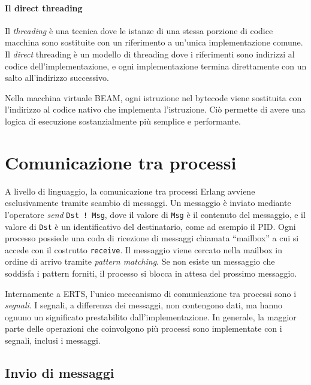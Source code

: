 \documentclass[target=bach,aauheader=,style=]{thud}
\newcommand{\eng}[1]{\foreignlanguage{english}{#1}}
\begin{document}
\paragraph{Il \eng{direct threading}}
Il \emph{\eng{threading}} è una tecnica dove le istanze di una stessa porzione di codice macchina sono sostituite con un riferimento a un'unica implementazione comune. Il \eng{\emph{direct} threading} è un modello di \eng{threading} dove i riferimenti sono indirizzi al codice dell'implementazione, e ogni implementazione termina direttamente con un salto all'indirizzo successivo.
\bigskip

Nella macchina virtuale BEAM, ogni istruzione nel \eng{bytecode} viene sostituita con l'indirizzo al codice nativo che implementa l'istruzione. Ciò permette di avere una logica di esecuzione sostanzialmente più semplice e performante.


\section{Comunicazione tra processi}

A livello di linguaggio, la comunicazione tra processi Erlang avviene esclusivamente tramite scambio di messaggi. Un messaggio è inviato mediante l'operatore \emph{\eng{send}} \lstinline{Dst ! Msg}, dove il valore di \lstinline{Msg} è il contenuto del messaggio, e il valore di \lstinline{Dst} è un identificativo del destinatario, come ad esempio il PID. Ogni processo possiede una coda di ricezione di messaggi chiamata ``\eng{mailbox}'' a cui si accede con il costrutto \lstinline{receive}. Il messaggio viene cercato nella \eng{mailbox} in ordine di arrivo tramite \emph{pattern \eng{matching}}. Se non esiste un messaggio che soddisfa i pattern forniti, il processo si blocca in attesa del prossimo messaggio.

Internamente a ERTS, l'unico meccanismo di comunicazione tra processi sono i \emph{segnali}. I segnali, a differenza dei messaggi, non contengono dati, ma hanno ognuno un significato prestabilito dall'implementazione. In generale, la maggior parte delle operazioni che coinvolgono più processi sono implementate con i segnali, inclusi i messaggi.

\subsection{Invio di messaggi}
\end{document}
